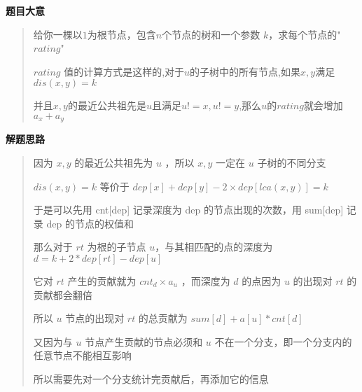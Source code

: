 \documentclass[E:/GsjzTle/main/main.tex]{subfiles}
\begin{document}
\textbf{题目大意}

\begin{quote}
给你一棵以\(1\)为根节点，包含\(n\)个节点的树和一个参数
\(k\)，求每个节点的"\(rating\)"

\(rating\)
值的计算方式是这样的,对于\(u\)的子树中的所有节点,如果\(x,y\)满足\(dis(x,y) = k\)

并且\(x,y\)的最近公共祖先是\(u\)且满足\(u != x , u != y\),那么\(u\)的\(rating\)就会增加\(a_x + a_y\)
\end{quote}

\textbf{解题思路}

\begin{quote}
因为 \(x , y\) 的最近公共祖先为 \(u\) ，所以 \(x , y\) 一定在 \(u\)
子树的不同分支

\(dis(x,y) = k\) 等价于 \(dep[x] + dep[y] - 2 × dep[lca(x,y)] = k\)

于是可以先用 cnt{[}dep{]} 记录深度为 dep 的节点出现的次数，用
sum{[}dep{]} 记录 dep 的节点的权值和

那么对于 \(rt\) 为根的子节点 \(u\)，与其相匹配的点的深度为
\(d = k + 2 * dep[rt] - dep[u]\)

它对 \(rt\) 产生的贡献就为 \(cnt_d × a_u\) ，而深度为 \(d\) 的点因为
\(u\) 的出现对 \(rt\) 的贡献都会翻倍

所以 \(u\) 节点的出现对 \(rt\) 的总贡献为 \(sum[d] + a[u] * cnt[d]\)

又因为与 \(u\) 节点产生贡献的节点必须和 \(u\)
不在一个分支，即一个分支内的任意节点不能相互影响

所以需要先对一个分支统计完贡献后，再添加它的信息
\end{quote}
\end{document}
